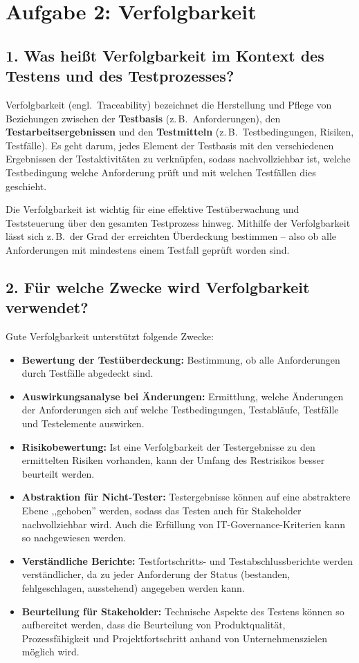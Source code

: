 \documentclass[
	fontsize=12pt,          %
	paper=a4,               %
	numbers=noenddot,       %
	listof=totoc,           %
	listof=entryprefix,     %
	listof=nochaptergap,    %
	bibliography=totoc,     %
	parskip=half,           %
	openany                 %
]{scrbook}
\begin{document}
\chapter*{Aufgabe 2: Verfolgbarkeit}


\section*{1. Was heißt Verfolgbarkeit im Kontext des Testens und des Testprozesses?}

Verfolgbarkeit (engl.\ Traceability) bezeichnet die Herstellung und Pflege von Beziehungen zwischen der \textbf{Testbasis} (z.\,B.\ Anforderungen), den \textbf{Testarbeitsergebnissen} und den \textbf{Testmitteln} (z.\,B.\ Testbedingungen, Risiken, Testfälle).
Es geht darum, jedes Element der Testbasis mit den verschiedenen Ergebnissen der Testaktivitäten zu verknüpfen, sodass nachvollziehbar ist, welche Testbedingung welche Anforderung prüft und mit welchen Testfällen dies geschieht.

Die Verfolgbarkeit ist wichtig für eine effektive Testüberwachung und Teststeuerung über den gesamten Testprozess hinweg.
Mithilfe der Verfolgbarkeit lässt sich z.\,B.\ der Grad der erreichten Überdeckung bestimmen -- also ob alle Anforderungen mit mindestens einem Testfall geprüft worden sind.


\section*{2. Für welche Zwecke wird Verfolgbarkeit verwendet?}

Gute Verfolgbarkeit unterstützt folgende Zwecke:
\begin{itemize}
	\item \textbf{Bewertung der Testüberdeckung:} Bestimmung, ob alle Anforderungen durch Testfälle abgedeckt sind.
	\item \textbf{Auswirkungsanalyse bei Änderungen:} Ermittlung, welche Änderungen der Anforderungen sich auf welche Testbedingungen, Testabläufe, Testfälle und Testelemente auswirken.
	\item \textbf{Risikobewertung:} Ist eine Verfolgbarkeit der Testergebnisse zu den ermittelten Risiken vorhanden, kann der Umfang des Restrisikos besser beurteilt werden.
	\item \textbf{Abstraktion für Nicht-Tester:} Testergebnisse können auf eine abstraktere Ebene ,,gehoben'' werden, sodass das Testen auch für Stakeholder nachvollziehbar wird.
	Auch die Erfüllung von IT-Governance-Kriterien kann so nachgewiesen werden.
	\item \textbf{Verständliche Berichte:} Testfortschritts- und Testabschlussberichte werden verständlicher, da zu jeder Anforderung der Status (bestanden, fehlgeschlagen, ausstehend) angegeben werden kann.
	\item \textbf{Beurteilung für Stakeholder:} Technische Aspekte des Testens können so aufbereitet werden, dass die Beurteilung von Produktqualität, Prozessfähigkeit und Projektfortschritt anhand von Unternehmenszielen möglich wird.
\end{itemize}
\end{document}

